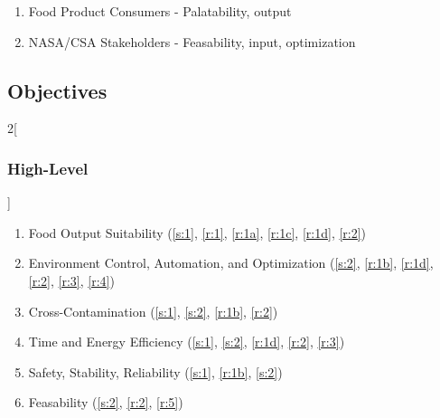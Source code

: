 \documentclass{report}
\begin{document}
\begin{enumerate}[label=S\arabic*., ref=S\arabic*]
    \item \label{s:1} Food Product Consumers - Palatability, output
    \item \label{s:2} NASA/CSA Stakeholders - Feasability, input, optimization
\end{enumerate}

\subsection{Objectives}
\label{sec:objectives}

\begin{multicols}{2}[\subsubsection{High-Level}\label{sec:hlos}]
    \begin{enumerate}[label=HL\arabic*., ref=HL\arabic*]
        \item \label{hl:output} Food Output Suitability \hfill (\ref{s:1}, \ref{r:1}, \ref{r:1a}, \ref{r:1c}, \ref{r:1d}, \ref{r:2})
        \item \label{hl:environment} Environment Control, Automation, and Optimization \hfill (\ref{s:2}, \ref{r:1b}, \ref{r:1d}, \ref{r:2}, \ref{r:3}, \ref{r:4})
        \item \label{hl:contamination} Cross-Contamination \hfill (\ref{s:1}, \ref{s:2}, \ref{r:1b}, \ref{r:2})
        \item \label{hl:efficiency} Time and Energy Efficiency \hfill (\ref{s:1}, \ref{s:2}, \ref{r:1d}, \ref{r:2}, \ref{r:3})
        \item \label{hl:safety} Safety, Stability, Reliability \hfill (\ref{s:1}, \ref{r:1b}, \ref{s:2})
        \item \label{hl:feasability} Feasability \hfill (\ref{s:2}, \ref{r:2}, \ref{r:5})
    \end{enumerate}
\end{multicols}
\end{document}
